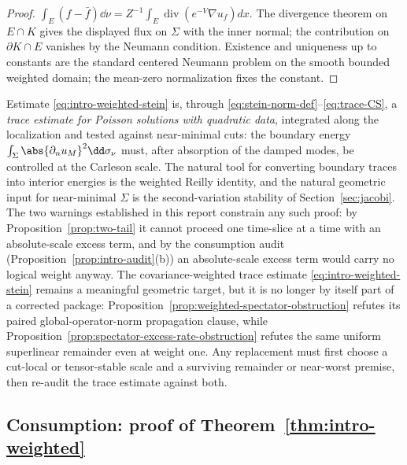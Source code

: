 \documentclass[../../main.tex]{subfiles}
\begin{document}
\begin{proof}
$\int_E(f-\bar f)\dd\nu=Z^{-1}\int_E\operatorname{div}(e^{-V}\nabla u_f)dx$.
The divergence theorem on $E\cap K$ gives the displayed flux on $\Sigma$ with the inner normal;
the contribution on $\partial K\cap E$ vanishes by the Neumann condition. Existence and
uniqueness up to constants are the standard centered Neumann problem on the smooth bounded
weighted domain; the mean-zero normalization fixes the constant.
\end{proof}

\begin{remark}
\label{rem:what-stein-is}
Estimate \eqref{eq:intro-weighted-stein} is, through
\eqref{eq:stein-norm-def}--\eqref{eq:trace-CS}, a \emph{trace estimate for Poisson solutions
with quadratic data}, integrated along the localization and tested against near-minimal cuts:
the boundary energy $\int_\Sigma\abs{\partial_nu_M}^2\dd\sigma_\nu$ must, after absorption of
the damped modes, be controlled at the Carleson scale. The natural tool for converting boundary
traces into interior energies is the weighted Reilly identity, and the natural geometric input
for near-minimal $\Sigma$ is the second-variation stability of Section~\ref{sec:jacobi}. The
two warnings established in this report constrain any such proof: by
Proposition~\ref{prop:two-tail} it cannot proceed one time-slice at a time with an
absolute-scale excess term, and by the consumption audit
(Proposition~\ref{prop:intro-audit}(b)) an absolute-scale excess term would carry no logical
weight anyway. The covariance-weighted trace estimate \eqref{eq:intro-weighted-stein} remains a
meaningful geometric target, but it is no longer by itself part of a corrected package:
Proposition~\ref{prop:weighted-spectator-obstruction} refutes its paired global-operator-norm
propagation clause, while Proposition~\ref{prop:spectator-excess-rate-obstruction} refutes the
same uniform superlinear remainder even at weight one. Any replacement must first choose a
cut-local or tensor-stable scale and a surviving remainder or near-worst premise, then re-audit
the trace estimate against both.
\end{remark}

\subsection{Consumption: proof of Theorem~\ref{thm:intro-weighted}}
\label{subsec:consumption}
\end{document}
